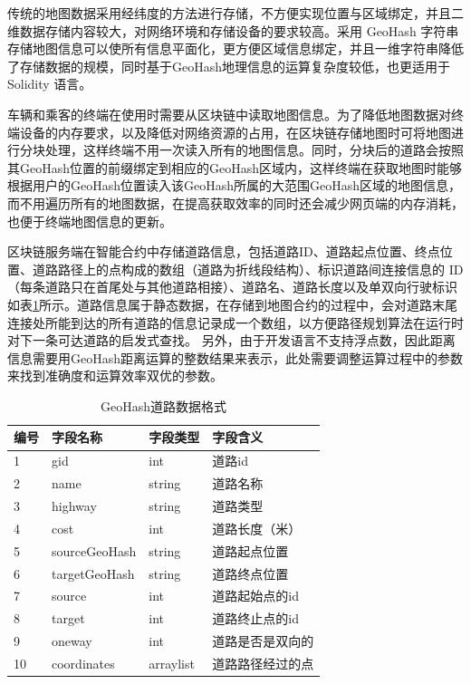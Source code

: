 传统的地图数据采用经纬度的方法进行存储，不方便实现位置与区域绑定，并且二维数据存储内容较大，对网络环境和存储设备的要求较高。采用 GeoHash 字符串存储地图信息可以使所有信息平面化，更方便区域信息绑定，并且一维字符串降低了存储数据的规模，同时基于GeoHash地理信息的运算复杂度较低，也更适用于 Solidity 语言。

车辆和乘客的终端在使用时需要从区块链中读取地图信息。为了降低地图数据对终端设备的内存要求，以及降低对网络资源的占用，在区块链存储地图时可将地图进行分块处理，这样终端不用一次读入所有的地图信息。同时，分块后的道路会按照其GeoHash位置的前缀绑定到相应的GeoHash区域内，这样终端在获取地图时能够根据用户的GeoHash位置读入该GeoHash所属的大范围GeoHash区域的地图信息，而不用遍历所有的地图数据，在提高获取效率的同时还会减少网页端的内存消耗，也便于终端地图信息的更新。

区块链服务端在智能合约中存储道路信息，包括道路ID、道路起点位置、终点位置、道路路径上的点构成的数组（道路为折线段结构）、标识道路间连接信息的 ID（每条道路只在首尾处与其他道路相接）、道路名、道路长度以及单双向行驶标识如表\ref{tab:roadFormat}所示。道路信息属于静态数据，在存储到地图合约的过程中，会对道路末尾连接处所能到达的所有道路的信息记录成一个数组，以方便路径规划算法在运行时对下一条可达道路的启发式查找。
另外，由于开发语言不支持浮点数，因此距离信息需要用GeoHash距离运算的整数结果来表示，此处需要调整运算过程中的参数来找到准确度和运算效率双优的参数。

\begin{table}
  \centering
  \caption{GeoHash道路数据格式}\label{tab:roadFormat}
  \begin{tabular*}{0.9\textwidth}{@{\extracolsep{\fill}}llll}
  \toprule
    编号    &字段名称 &字段类型 &字段含义 \\
  \midrule
    1    &gid &int &道路id\\
    2    &name &string &道路名称\\
    3    &highway &string &道路类型\\
    4    &cost &int &道路长度（米）\\
    5    &sourceGeoHash &string &道路起点位置\\
    6    &targetGeoHash &string &道路终点位置\\
    7    &source &int &道路起始点的id\\
    8    &target &int &道路终止点的id\\
    9    &oneway &int &道路是否是双向的\\
    10   &coordinates &arraylist &道路路径经过的点\\
  \bottomrule
  \end{tabular*}
\end{table}

